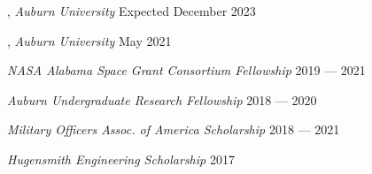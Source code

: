 
, \textit{Auburn University}	\hfill Expected December 2023

, \textit{Auburn University} \hfill	May 2021

\textit{NASA Alabama Space Grant Consortium Fellowship} 	\hfill 2019 --- 2021

\textit{Auburn Undergraduate Research Fellowship} \hfill	2018 --- 2020

\textit{Military Officers Assoc. of America Scholarship} \hfill	2018 --- 2021

\textit{Hugensmith Engineering Scholarship} \hfill	2017




